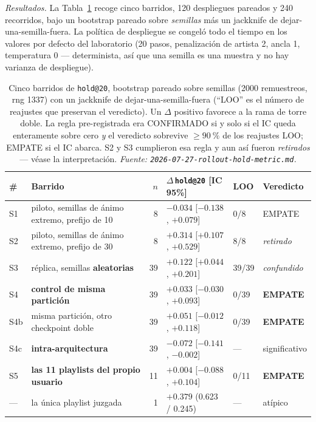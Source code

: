 \documentclass[11pt]{article}
\newcommand{\best}[1]{\textbf{#1}}
\begin{document}
\emph{Resultados.} La Tabla~\ref{tab:nexttrack-rollout} recoge cinco barridos, \num{120}
despliegues pareados y \num{240} recorridos, bajo un bootstrap pareado sobre
\emph{semillas} más un jackknife de dejar-una-semilla-fuera. La política de
despliegue se congeló todo el tiempo en los valores por defecto del laboratorio
(\num{20} pasos, penalización de artista \num{2}, ancla \num{1}, temperatura
\num{0} --- determinista, así que una semilla es una muestra y no hay varianza de
despliegue).

\begin{table}[ht]
  \centering
  \caption{Cinco barridos de \texttt{hold@20}, bootstrap pareado sobre semillas
  (\num{2000} remuestreos, rng \num{1337}) con un jackknife de
  dejar-una-semilla-fuera (``LOO'' es el número de reajustes que preservan el
  veredicto). Un $\Delta$ positivo favorece a la rama de torre doble. La regla
  pre-registrada era CONFIRMADO si y solo si el IC queda enteramente sobre cero
  \emph{y} el veredicto sobrevive $\ge\SI{90}{\percent}$ de los reajustes LOO;
  EMPATE si el IC abarca. S2 y S3 cumplieron esa regla y aun así fueron
  \emph{retirados} --- véase la interpretación.
  \emph{Fuente: \texttt{2026-07-27-rollout-hold-metric.md}.}}
  \label{tab:nexttrack-rollout}
  {\footnotesize\setlength{\tabcolsep}{4pt}\begin{tabular}{llrlll}
    \toprule
    \# & Barrido & $n$ & $\Delta$\,\texttt{hold@20} [IC 95\%] & LOO & Veredicto \\
    \midrule
    S1 & piloto, semillas de ánimo extremo, prefijo de 10 & 8 & $-0.034$ [$-0.138$, $+0.079$] & 0/8 & EMPATE \\
    S2 & piloto, semillas de ánimo extremo, prefijo de 30 & 8 & $+0.314$ [$+0.107$, $+0.529$] & 8/8 & \emph{retirado} \\
    S3 & réplica, semillas \textbf{aleatorias} & 39 & $+0.122$ [$+0.044$, $+0.201$] & 39/39 & \emph{confundido} \\
    S4 & \textbf{control de misma partición} & 39 & $+0.033$ [$-0.030$, $+0.093$] & 0/39 & \best{EMPATE} \\
    S4b & misma partición, otro checkpoint doble & 39 & $+0.051$ [$-0.012$, $+0.118$] & 0/39 & \best{EMPATE} \\
    S4c & \textbf{intra-arquitectura} & 39 & $-0.072$ [$-0.141$, $-0.002$] & --- & significativo \\
    S5 & \textbf{las \num{11} playlists del propio usuario} & 11 & $+0.004$ [$-0.088$, $+0.104$] & 0/11 & \best{EMPATE} \\
    --- & la única playlist juzgada & 1 & $+0.379$ (\num{0.623} / \num{0.245}) & --- & atípico \\
    \bottomrule
  \end{tabular}}
\end{table}
\end{document}

